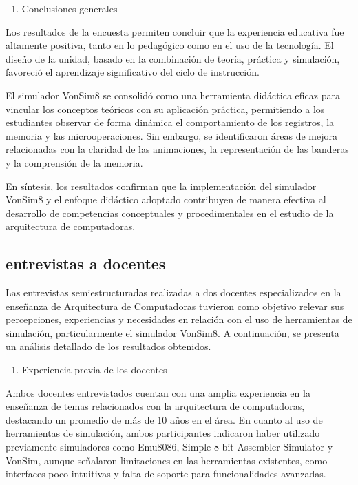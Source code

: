 \documentclass[12pt,oneside]{templates/unerthesis}
\providecommand{\tightlist}{%
  \setlength{\itemsep}{0pt}\setlength{\parskip}{0pt}}
\begin{document}
\begin{enumerate}
\def\labelenumi{\arabic{enumi}.}
\setcounter{enumi}{5}
\tightlist
\item
  Conclusiones generales
\end{enumerate}

Los resultados de la encuesta permiten concluir que la experiencia educativa fue altamente positiva, tanto en lo pedagógico como en el uso de la tecnología. El diseño de la unidad, basado en la combinación de teoría, práctica y simulación, favoreció el aprendizaje significativo del ciclo de instrucción.

El simulador VonSim8 se consolidó como una herramienta didáctica eficaz para vincular los conceptos teóricos con su aplicación práctica, permitiendo a los estudiantes observar de forma dinámica el comportamiento de los registros, la memoria y las microoperaciones.
Sin embargo, se identificaron áreas de mejora relacionadas con la claridad de las animaciones, la representación de las banderas y la comprensión de la memoria.

En síntesis, los resultados confirman que la implementación del simulador VonSim8 y el enfoque didáctico adoptado contribuyen de manera efectiva al desarrollo de competencias conceptuales y procedimentales en el estudio de la arquitectura de computadoras.

\hypertarget{entrevistas-a-docentes}{%
\subsection{entrevistas a docentes}\label{entrevistas-a-docentes}}

Las entrevistas semiestructuradas realizadas a dos docentes especializados en la enseñanza de Arquitectura de Computadoras tuvieron como objetivo relevar sus percepciones, experiencias y necesidades en relación con el uso de herramientas de simulación, particularmente el simulador VonSim8. A continuación, se presenta un análisis detallado de los resultados obtenidos.

\begin{enumerate}
\def\labelenumi{\arabic{enumi}.}
\tightlist
\item
  Experiencia previa de los docentes
\end{enumerate}

Ambos docentes entrevistados cuentan con una amplia experiencia en la enseñanza de temas relacionados con la arquitectura de computadoras, destacando un promedio de más de 10 años en el área. En cuanto al uso de herramientas de simulación, ambos participantes indicaron haber utilizado previamente simuladores como Emu8086, Simple 8-bit Assembler Simulator y VonSim, aunque señalaron limitaciones en las herramientas existentes, como interfaces poco intuitivas y falta de soporte para funcionalidades avanzadas.
\end{document}
